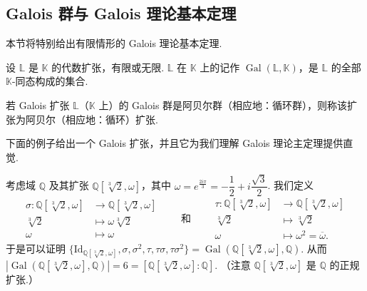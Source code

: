 \subsection{Galois 群与 Galois 理论基本定理}

本节将特别给出有限情形的 Galois 理论基本定理.

\begin{definition}\label{c2-def-1-18}
设 $\mathbb{L}$ 是 $\mathbb{K}$ 的代数扩张，有限或无限. $\mathbb{L}$ 在 $\mathbb{K}$ 上的记作 $\operatorname{Gal}(\mathbb{L},\mathbb{K})$，是 $\mathbb{L}$ 的全部 $\mathbb{K}$-同态构成的集合.
\end{definition}

\begin{definition}\label{c2-def-1-19}
若 Galois 扩张 $\mathbb{L}$（$\mathbb{K}$ 上）的 Galois 群是阿贝尔群（相应地：循环群），则称该扩张为阿贝尔（相应地：循环）扩张.
\end{definition}

下面的例子给出一个 Galois 扩张，并且它为我们理解 Galois 理论主定理提供直觉.

\begin{example}\label{c2-ex-1-20}
考虑域 $\mathbb{Q}$ 及其扩张 $\mathbb{Q}[\sqrt[3]{2},\omega]$，其中 $\omega=e^{\frac{2i\pi}{3}}=-\dfrac{1}{2}+i\dfrac{\sqrt{3}}{2}$. 我们定义
\[
\begin{aligned}
\sigma:\mathbb{Q}[\sqrt[3]{2},\omega]&\longrightarrow\mathbb{Q}[\sqrt[3]{2},\omega]\\
\sqrt[3]{2}&\longmapsto\omega\sqrt[3]{2}\\
\omega&\longmapsto\omega
\end{aligned}
\qquad\text{和}\qquad
\begin{aligned}
\tau:\mathbb{Q}[\sqrt[3]{2},\omega]&\longrightarrow\mathbb{Q}[\sqrt[3]{2},\omega]\\
\sqrt[3]{2}&\longmapsto\sqrt[3]{2}\\
\omega&\longmapsto\omega^{2}=\overline{\omega}.
\end{aligned}
\]
于是可以证明 $\{\mathrm{Id}_{\mathbb{Q}[\sqrt[3]{2},\omega]},\sigma,\sigma^{2},\tau,\tau\sigma,\tau\sigma^{2}\}=\operatorname{Gal}(\mathbb{Q}[\sqrt[3]{2},\omega],\mathbb{Q})$. 从而 $|\operatorname{Gal}(\mathbb{Q}[\sqrt[3]{2},\omega],\mathbb{Q})|=6=[\mathbb{Q}[\sqrt[3]{2},\omega]:\mathbb{Q}]$. （注意 $\mathbb{Q}[\sqrt[3]{2},\omega]$ 是 $\mathbb{Q}$ 的正规扩张.）
\end{example}

